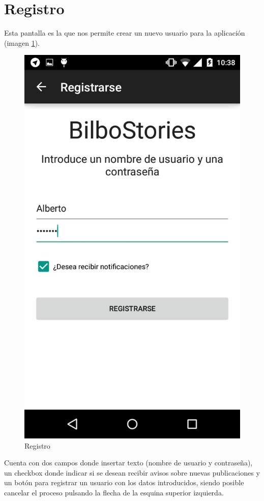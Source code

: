 \documentclass[11pt,a4paper, titlepage]{article}
\begin{document}
	\FloatBarrier
	\section[Registro]{Registro}
	\label{regis}
	
	Esta pantalla es la que nos permite crear un nuevo usuario para la aplicación (imagen \ref{p14}). 
	
	\begin{figure}[hbtp]
		\centering
		\includegraphics[scale = 0.25 ]{img/2}
		\caption{Registro}
		\label{p14}
	\end{figure}
Cuenta con dos campos donde insertar texto (nombre de usuario y contraseña), un checkbox donde indicar si se desean recibir avisos sobre nuevas publicaciones y un botón para registrar un usuario con los datos introducidos, siendo posible cancelar el proceso pulsando la flecha de la esquina superior izquierda.
\end{document}
